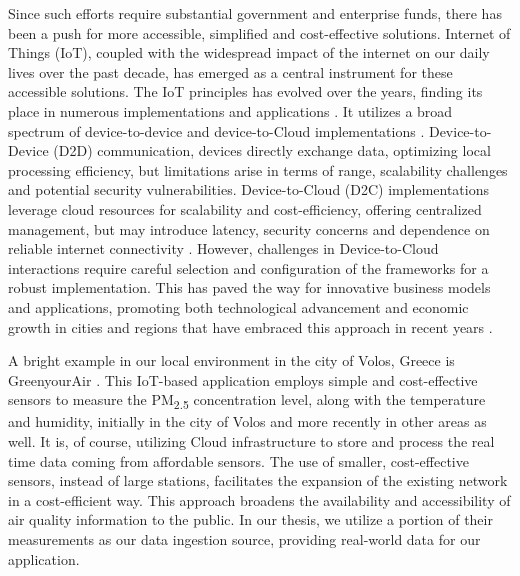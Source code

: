Since such efforts require substantial government and enterprise funds, there has been a push for more accessible, simplified and cost-effective solutions. Internet of Things (IoT), coupled with the widespread impact of the internet on our daily lives \cite{madakam2015internet,ImpactofIoT-BasedSmartCities} over the past decade, has emerged as a central instrument for these accessible solutions. The IoT principles has evolved over the years, finding its place in numerous implementations and applications \cite{ImpactofIoT-BasedSmartCities,7562698}. It utilizes a broad spectrum of device-to-device and device-to-Cloud implementations \cite{IotArchitecture}. Device-to-Device (D2D) communication, devices directly exchange data, optimizing local processing efficiency, but limitations arise in terms of range, scalability challenges and potential security vulnerabilities. Device-to-Cloud (D2C) implementations leverage cloud resources for scalability and cost-efficiency, offering centralized management, but may introduce latency, security concerns and dependence on reliable internet connectivity \cite{CloudIoT}. However, challenges in Device-to-Cloud interactions require careful selection and configuration of the frameworks for a robust implementation. This has paved the way for innovative business models and applications, promoting both technological advancement and economic growth in cities and regions that have embraced this approach in recent years \cite{rose2015internet,7300835}.

A bright example in our local environment in the city of Volos, Greece is GreenyourAir \cite{GreenyourAir}. This IoT-based application employs simple and cost-effective sensors to measure the PM\textsubscript{2.5} concentration level, along with the temperature and humidity, initially in the city of Volos and more recently in other areas as well. It is, of course, utilizing Cloud infrastructure to store and process the real time data coming from affordable sensors. The use of smaller, cost-effective sensors, instead of large stations, facilitates the expansion of the existing network in a cost-efficient way. This approach broadens the availability and accessibility of air quality information to the public. In our thesis, we utilize a portion of their measurements as our data ingestion source, providing real-world data for our application.


\clearpage
